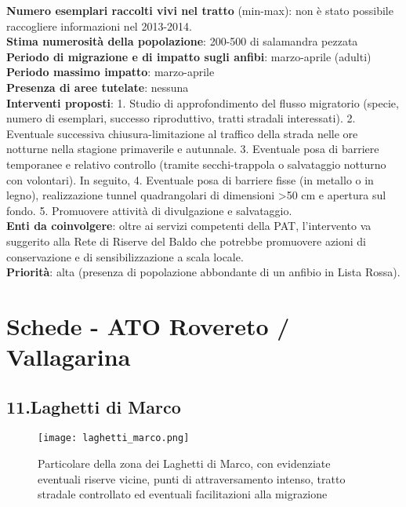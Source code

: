 \documentclass[11pt,a4paper,twoside]{memoir}
\begin{document}
\textbf{Numero esemplari raccolti vivi nel tratto} (min-max): non è stato possibile raccogliere informazioni nel 2013-2014. \\ 
\textbf{Stima numerosità della popolazione}: 200-500 di salamandra pezzata \\
\textbf{Periodo di migrazione e di impatto sugli anfibi}: marzo-aprile (adulti) \\
\textbf{Periodo massimo impatto}: marzo-aprile \\
\textbf{Presenza di aree tutelate}: nessuna \\
\textbf{Interventi proposti}: 1. Studio di approfondimento del flusso migratorio (specie, numero di esemplari, successo riproduttivo, tratti stradali interessati). 2. Eventuale successiva chiusura-limitazione al traffico della strada nelle ore notturne nella stagione primaverile e autunnale. 3. Eventuale posa di barriere temporanee e relativo controllo (tramite secchi-trappola o salvataggio notturno con volontari). In seguito, 4. Eventuale posa di barriere fisse (in metallo o in legno), realizzazione tunnel quadrangolari di dimensioni >50 cm e apertura sul fondo. 5. Promuovere attività di divulgazione e salvataggio. \\
\textbf{Enti da coinvolgere}: oltre ai servizi competenti della PAT, l’intervento va suggerito alla Rete di Riserve del Baldo che potrebbe promuovere azioni di conservazione e di sensibilizzazione a scala locale. \\
\textbf{\textbf{Priorità}}: alta (presenza di popolazione abbondante di un anfibio in Lista Rossa). \\

\newpage
\section{Schede - ATO Rovereto / Vallagarina}
\begin{tcolorbox}[breakable,colback=white,colframe=green,width=10cm]
\subsection{11.Laghetti di Marco}
\end{tcolorbox}

\begin{figure}[H]
\label{fig:map_marco}
\centering
  \texttt{[image: laghetti\_marco.png]}
\caption{Particolare della zona dei Laghetti di Marco, con evidenziate eventuali riserve vicine, punti di attraversamento intenso, tratto stradale controllato ed eventuali facilitazioni alla migrazione}
\end{figure}
\end{document}
